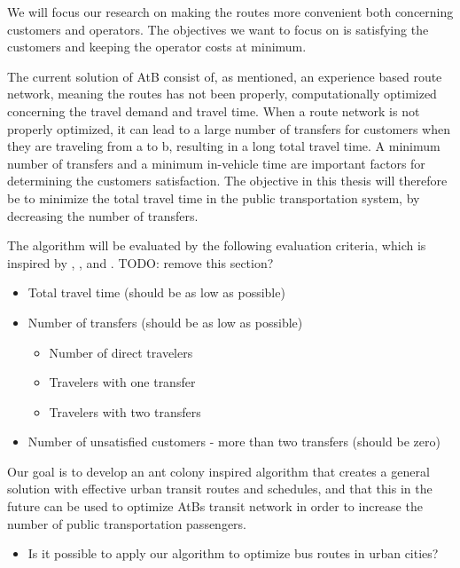 We will focus our research on making the routes more convenient both concerning customers and operators. The objectives we want to focus on is satisfying the customers and keeping the operator costs at minimum. 

The current solution of AtB \citep{website:atb} consist of, as mentioned, an experience based route network, meaning the routes has not been properly, computationally optimized concerning the travel demand and travel time. When a route network is not properly optimized, it can lead to a large number of transfers for customers when they are traveling from a to b, resulting in a long total travel time. A minimum number of transfers and a minimum in-vehicle time are important factors for determining the customers satisfaction. The objective in this thesis will therefore be to minimize the total travel time in the public transportation system, by decreasing the number of transfers. %

The algorithm will be evaluated by the following evaluation criteria, which is inspired by \citep{kechagiopoulos14}, \citep{mandl80}, \citep{nikolic14} and \citep{fan09}. TODO: remove this section?
\begin{itemize}
\item Total travel time (should be as low as possible)
\item Number of transfers (should be as low as possible)
\begin{itemize}
\item Number of direct travelers 
\item Travelers with one transfer
\item Travelers with two transfers
\end{itemize}
\item Number of unsatisfied customers - more than two transfers (should be zero)
\end{itemize}

Our goal is to develop an ant colony inspired algorithm that creates a general solution with effective urban transit routes and schedules, and that this in the future can be used to optimize AtBs transit network in order to increase the number of public transportation passengers. 
\begin{itemize}
\item Is it possible to apply our algorithm to optimize bus routes in urban cities?
\end{itemize}
